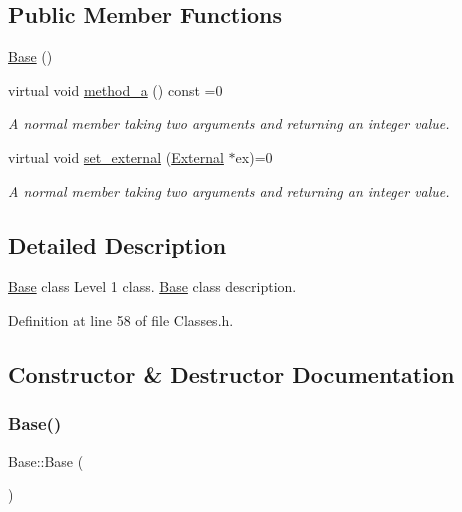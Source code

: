 \subsection*{Public Member Functions}
\begin{DoxyCompactItemize}
\item 
\hyperlink{class_base_a5ffe0568374d8b9b4c4ec32953fd6453}{Base} ()
\item 
virtual void \hyperlink{class_base_ace5096ac7dfb41f2577321923e3048bf}{method\+\_\+a} () const =0
\begin{DoxyCompactList}\small\item\em A normal member taking two arguments and returning an integer value. \end{DoxyCompactList}\item 
virtual void \hyperlink{class_base_a87ec2d3dcffa1d22d4fe4f651f625d49}{set\+\_\+external} (\hyperlink{class_external}{External} $\ast$ex)=0
\begin{DoxyCompactList}\small\item\em A normal member taking two arguments and returning an integer value. \end{DoxyCompactList}\end{DoxyCompactItemize}


\subsection{Detailed Description}
\hyperlink{class_base}{Base} class Level 1 class. \hyperlink{class_base}{Base} class description. 

Definition at line 58 of file Classes.\+h.



\subsection{Constructor \& Destructor Documentation}
\mbox{\label{class_base_a5ffe0568374d8b9b4c4ec32953fd6453}} 
\subsubsection{\texorpdfstring{Base()}{Base()}}
{\footnotesize\ttfamily Base\+::\+Base (\begin{DoxyParamCaption}{ }\end{DoxyParamCaption})\hspace{0.3cm}{\ttfamily [inline]}}



